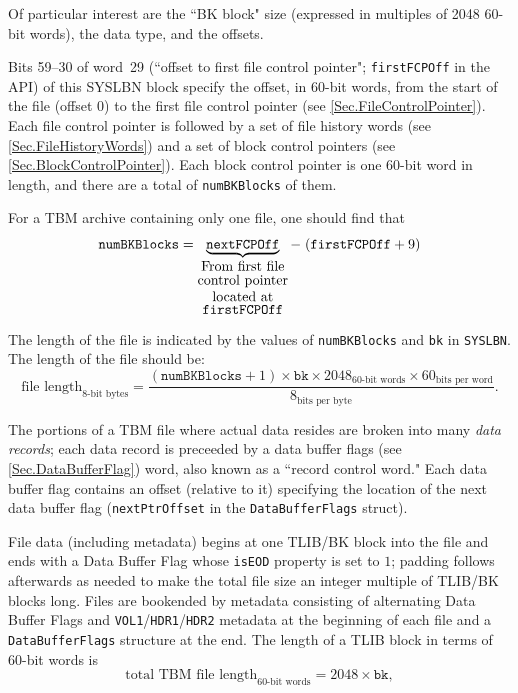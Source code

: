 \documentclass{report}
\begin{document}
\noindent Of particular interest are the ``BK block" size (expressed in multiples of 2048 60-bit words), the data type, and the offsets.

Bits 59--30 of word~29 (``offset to first file control pointer"; \texttt{firstFCPOff} in the API) of this SYSLBN block specify the offset, in 60-bit words, from the start of the file (offset 0) to the first file control pointer (see \cref{Sec.FileControlPointer}). Each file control pointer is followed by a set of file history words (see \cref{Sec.FileHistoryWords}) and a set of block control pointers (see \cref{Sec.BlockControlPointer}). Each block control pointer is one 60-bit word in length, and there are a total of \texttt{numBKBlocks} of them.

For a TBM archive containing only one file, one should find that
\begin{align*}
	\mathtt{numBKBlocks} =
	\underbrace{\mathtt{nextFCPOff}}_{\shortstack[c]{
		From first file\\
		control pointer\\
		located at\\
		\texttt{firstFCPOff}
	}} - \; (\mathtt{firstFCPOff} + 9)
\end{align*}

The length of the file is indicated by the values of \texttt{numBKBlocks} and \texttt{bk} in \texttt{SYSLBN}. The length of the file should be:
\[
	\text{file length}_\text{8-bit bytes} = \dfrac{(\texttt{numBKBlocks} + 1) \times \texttt{bk} \times 2048_\text{60-bit words} \times 60_\text{bits per word}}{8_\text{bits per byte}} \mathrm{.}
\]

The portions of a TBM file where actual data resides are broken into many \textit{data records}; each data record is preceeded by a data buffer flags (see \cref{Sec.DataBufferFlag}) word, also known as a ``record control word." Each data buffer flag contains an offset (relative to it) specifying the location of the next data buffer flag (\texttt{nextPtrOffset} in the \texttt{DataBufferFlags} struct).

File data (including metadata) begins at one TLIB/BK block into the file and ends with a Data Buffer Flag whose \texttt{isEOD} property is set to \(1\); padding follows afterwards as needed to make the total file size an integer multiple of TLIB/BK blocks long. Files are bookended by metadata consisting of alternating Data Buffer Flags and \texttt{VOL1}/\texttt{HDR1}/\texttt{HDR2} metadata at the beginning of each file and a \texttt{DataBufferFlags} structure at the end. The length of a TLIB block in terms of 60-bit words is
\[
	\text{total TBM file length}_\text{60-bit words} = 2048 \times \texttt{bk} \mathrm{,}
\]
\end{document}

